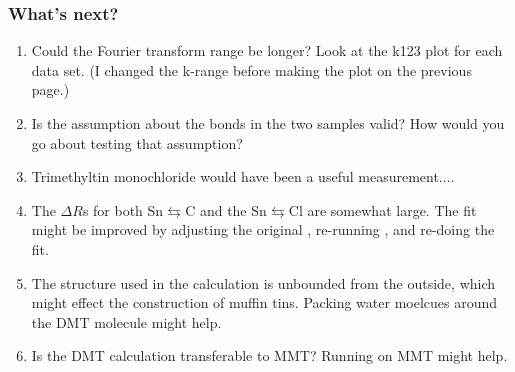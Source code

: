 \documentclass[10pt, xcolor=x11names, compress, handout]{beamer}
\begin{document}
\begin{frame}
  \frametitle{What's next?}
  \begin{enumerate}
  \item Could the Fourier transform range be longer?  Look at the k123
    plot for each data set.  (I changed the k-range before making the
    plot on the previous page.)
  \item Is the assumption about the bonds in the two samples valid?
    How would you go about testing that assumption?
  \item Trimethyltin monochloride would have been a useful
    measurement....
  \item The $\Delta R$s for both Sn$\leftrightarrows$C and the
    Sn$\leftrightarrows$Cl are somewhat large.  The fit might be
    improved by adjusting the original , re-running
    {\feff}, and re-doing the fit.
  \item The structure used in the {\feff} calculation is unbounded
    from the outside, which might effect the construction of muffin
    tins.  Packing water moelcues around the DMT molecule might help.
  \item Is the DMT {\feff} calculation transferable to MMT?  Running
    {\feff} on MMT might help.
  \end{enumerate}
\end{frame}
\end{document}
